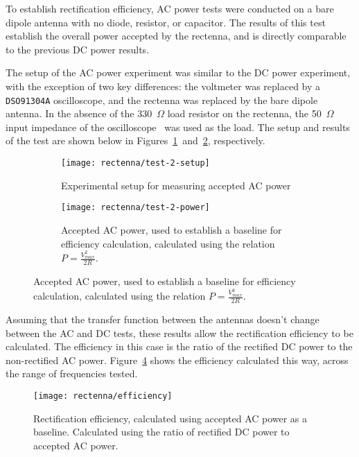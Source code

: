 To establish rectification efficiency, AC power tests were conducted on a bare dipole antenna with no diode, resistor, or capacitor. The results of this test establish the overall power accepted by the rectenna, and is directly comparable to the previous DC power results.

The setup of the AC power experiment was similar to the DC power experiment, with the exception of two key differences: the voltmeter was replaced by a \texttt{DSO91304A} oscilloscope, and the rectenna was replaced by the bare dipole antenna. In the absence of the 330~$\Omega$ load resistor on the rectenna, the 50~$\Omega$ input impedance of the oscilloscope~\cite{DSO91304A-manual} was used as the load. The setup and results of the test are shown below in Figures~\ref{fig:rectenna-test-2-setup}~and~\ref{fig:rectenna-test-2-power}, respectively.

\begin{figure}[h!]
    \centering
    \begin{subfigure}{.85\textwidth}
        \centering
        \texttt{[image: rectenna/test-2-setup]}
        \caption{Experimental setup for measuring accepted AC power}
        \label{fig:rectenna-test-2-setup}
    \end{subfigure}
    \begin{subfigure}{.85\textwidth}
        \centering
        \texttt{[image: rectenna/test-2-power]}
        \caption[Accepted AC power]{Accepted AC power, used to establish a baseline for efficiency calculation, calculated using the relation $P = \frac{V_{max}^2}{2R}$.}
        \label{fig:rectenna-test-2-power}
    \end{subfigure}
    \label{fig:rectenna-test-2}
\end{figure}

Assuming that the transfer function between the antennas doesn't change between the AC and DC tests, these results allow the rectification efficiency to be calculated. The efficiency in this case is the ratio of the rectified DC power to the non-rectified AC power. Figure~\ref{fig:rectenna-efficiency} shows the efficiency calculated this way, across the range of frequencies tested.

\begin{figure}[h!]
\centering
\texttt{[image: rectenna/efficiency]}
    \caption[Rectification efficiency]{Rectification efficiency, calculated using accepted AC power as a baseline. Calculated using the ratio of rectified DC power to accepted AC power.}
    \label{fig:rectenna-efficiency}
\end{figure}

